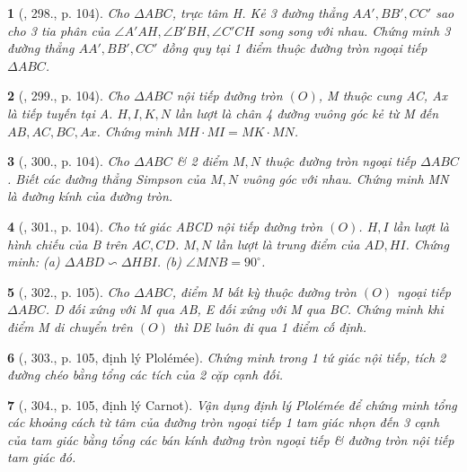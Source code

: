 \documentclass{article}
\newtheorem{baitoan}{}
\begin{document}
\begin{baitoan}[\cite{Binh_Toan_9_tap_2}, 298., p. 104]
	Cho $\Delta ABC$, trực tâm H. Kẻ 3 đường thẳng $AA',BB',CC'$ sao cho 3 tia phân của $\angle{A'AH},\angle{B'BH},\angle{C'CH}$ song song với nhau. Chứng minh 3 đường thẳng $AA',BB',CC'$ đồng quy tại 1 điểm thuộc đường tròn ngoại tiếp $\Delta ABC$.
\end{baitoan}

\begin{baitoan}[\cite{Binh_Toan_9_tap_2}, 299., p. 104]
	Cho $\Delta ABC$ nội tiếp đường tròn $(O)$, M thuộc cung AC, Ax là tiếp tuyến tại A. $H,I,K,N$ lần lượt là chân 4 đường vuông góc kẻ từ M đến $AB,AC,BC,Ax$. Chứng minh $MH\cdot MI = MK\cdot MN$.
\end{baitoan}

\begin{baitoan}[\cite{Binh_Toan_9_tap_2}, 300., p. 104]
	Cho $\Delta ABC$ \& 2 điểm $M,N$ thuộc đường tròn ngoại tiếp $\Delta ABC$. Biết các đường thẳng Simpson của $M,N$ vuông góc với nhau. Chứng minh MN là đường kính của đường tròn.
\end{baitoan}

\begin{baitoan}[\cite{Binh_Toan_9_tap_2}, 301., p. 104]
	Cho tứ giác ABCD nội tiếp đường tròn $(O)$. $H,I$ lần lượt là hình chiếu của B trên $AC,CD$. $M,N$ lần lượt là trung điểm của $AD,HI$. Chứng minh: (a) $\Delta ABD\backsim\Delta HBI$. (b) $\angle{MNB} = 90^\circ$.
\end{baitoan}

\begin{baitoan}[\cite{Binh_Toan_9_tap_2}, 302., p. 105]
	Cho $\Delta ABC$, điểm M bất kỳ thuộc đường tròn $(O)$ ngoại tiếp $\Delta ABC$. D đối xứng với M qua AB, E đối xứng với M qua BC. Chứng minh khi điểm M di chuyển trên $(O)$ thì DE luôn đi qua 1 điểm cố định.
\end{baitoan}

\begin{baitoan}[\cite{Binh_Toan_9_tap_2}, 303., p. 105, định lý Plol\'em\'ee]
	Chứng minh trong 1 tứ giác nội tiếp, tích 2 đường chéo bằng tổng các tích của 2 cặp cạnh đối.
\end{baitoan}

\begin{baitoan}[\cite{Binh_Toan_9_tap_2}, 304., p. 105, định lý Carnot]
	Vận dụng định lý Plol\'em\'ee để chứng minh tổng các khoảng cách từ tâm của đường tròn ngoại tiếp 1 tam giác nhọn đến 3 cạnh của tam giác bằng tổng các bán kính đường tròn ngoại tiếp \& đường tròn nội tiếp tam giác đó.
\end{baitoan}
\end{document}
